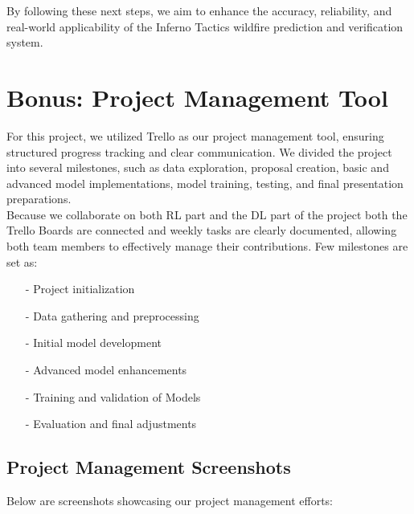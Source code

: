 \documentclass[conference]{IEEEtran}
\begin{document}
By following these next steps, we aim to enhance the accuracy, reliability, and real-world applicability of the Inferno Tactics wildfire prediction and verification system.


\section{Bonus: Project Management Tool}
For this project, we utilized Trello as our project management tool, ensuring structured progress tracking and clear communication. We divided the project into several milestones, such as data exploration, proposal creation, basic and advanced model implementations, model training, testing, and final presentation preparations.\\

Because we collaborate on both RL part and the DL part of the project both the Trello Boards are connected and weekly tasks are clearly documented, allowing both team members to effectively manage their contributions. Few milestones are set as:

\begin{enumerate}
\item[-] Project initialization
\item[-] Data gathering and preprocessing
\item[-] Initial model development
\item[-] Advanced model enhancements
\item[-] Training and validation of Models
\item[-] Evaluation and final adjustments
\end{enumerate}

\subsection{Project Management Screenshots}
Below are screenshots showcasing our project management efforts:
\end{document}

